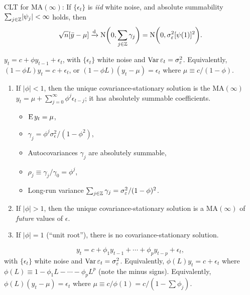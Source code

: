 \documentclass[8pt,letterpaper, landscape]{extarticle} %
\begin{document}
\begin{multicols}{3}
\begin{description}
CLT for $ \text{MA} (\infty) $: If $ \{ \epsilon_t \} $ is \textit{iid} white noise, and absolute summability $ \sum_{j \in \mathbb{Z}} \lvert \psi_j \rvert < \infty $ holds, then
\[ \sqrt{n} [\bar{y} - \mu ] \xrightarrow{\text{d}} \operatorname{N} \biggl( 0, \sum_{j \in \mathbb{Z}} \gamma_j \biggr) = \operatorname{N} \biggl( 0, \sigma^2_{\varepsilon} [\psi (1)]^{2} \biggr). \]

 $ y_t = c + \phi y_{t-1} + \epsilon_{t} $, with $ \{ \epsilon_t \} $ white noise and $ \operatorname{Var} \varepsilon_t = \sigma^2_\varepsilon $. Equivalently, $ (1 - \phi L) y_t = c + \epsilon_t $, or $ (1 - \phi L)(y_t - \mu) = \epsilon_t $ where $ \mu \equiv c / (1 - \phi) $.
\begin{enumerate}
\item If $ | \phi | < 1 $, then the unique covariance-stationary solution is the $ \text{MA}(\infty) $ $ y_t = \mu + \sum_{j=0}^{\infty} \phi^{j} \epsilon_{t-j} $; it has absolutely summable coefficients.
\begin{itemize}
\item $ \operatorname{E} y_t = \mu $,
\item $ \gamma_j = \phi^j \sigma^2_\epsilon / (1 - \phi^2) $,
\item Autocovariances $ \gamma_j $ are absolutely summable,
\item $ \rho_j \equiv \gamma_j / \gamma_0 = \phi^j $,
\item Long-run variance $ \sum_{j \in \mathbb{Z}} \gamma_j = \sigma^2_\varepsilon / (1 - \phi)^2 $.
\end{itemize}
\item If $ | \phi | > 1 $, then the unique covariance-stationary solution is a $ \text{MA}(\infty) $ of \textit{future} values of $ \epsilon $.
\item If $ | \phi | = 1 $ (``unit root''), there is no covariance-stationary solution.
\end{enumerate}

$$ y_t = c + \phi_1 y_{t-1} + \dotsb + \phi_p y_{t-p} + \epsilon_{t}, $$
with $ \{ \epsilon_t \} $ white noise and $ \operatorname{Var} \varepsilon_t = \sigma^2_\varepsilon $. Equivalently, $ \phi (L) y_t = c + \epsilon_t $ where $ \phi (L) \equiv 1 - \phi_1 L - \dotsb - \phi_p L^p $ (note the minus signs). Equivalently, $ \phi (L) (y_t - \mu) = \epsilon_t $ where $ \mu \equiv c / \phi (1) = c / (1 - \sum \phi_j) $.


\end{description}
\end{multicols}
\end{document}
